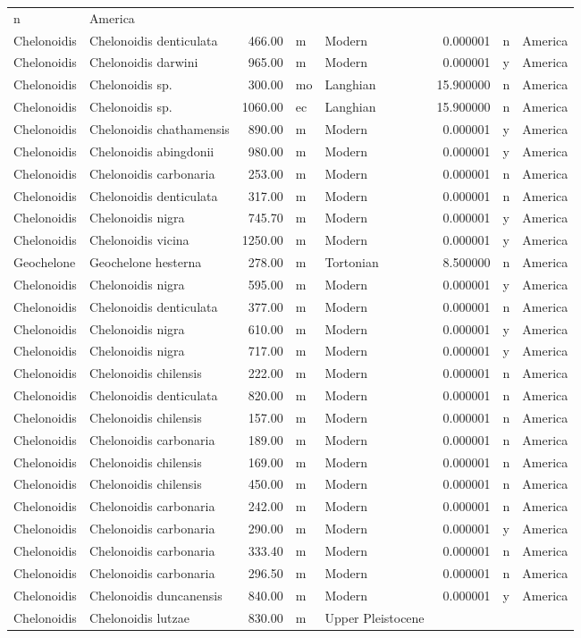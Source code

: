 \documentclass[]{article}
\begin{document}
\begin{longtable}[]{@{}llrllrll@{}}
n & America\tabularnewline
Chelonoidis & Chelonoidis denticulata & 466.00 & m & Modern & 0.000001 &
n & America\tabularnewline
Chelonoidis & Chelonoidis darwini & 965.00 & m & Modern & 0.000001 & y &
America\tabularnewline
Chelonoidis & Chelonoidis sp. & 300.00 & mo & Langhian & 15.900000 & n &
America\tabularnewline
Chelonoidis & Chelonoidis sp. & 1060.00 & ec & Langhian & 15.900000 & n
& America\tabularnewline
Chelonoidis & Chelonoidis chathamensis & 890.00 & m & Modern & 0.000001
& y & America\tabularnewline
Chelonoidis & Chelonoidis abingdonii & 980.00 & m & Modern & 0.000001 &
y & America\tabularnewline
Chelonoidis & Chelonoidis carbonaria & 253.00 & m & Modern & 0.000001 &
n & America\tabularnewline
Chelonoidis & Chelonoidis denticulata & 317.00 & m & Modern & 0.000001 &
n & America\tabularnewline
Chelonoidis & Chelonoidis nigra & 745.70 & m & Modern & 0.000001 & y &
America\tabularnewline
Chelonoidis & Chelonoidis vicina & 1250.00 & m & Modern & 0.000001 & y &
America\tabularnewline
Geochelone & Geochelone hesterna & 278.00 & m & Tortonian & 8.500000 & n
& America\tabularnewline
Chelonoidis & Chelonoidis nigra & 595.00 & m & Modern & 0.000001 & y &
America\tabularnewline
Chelonoidis & Chelonoidis denticulata & 377.00 & m & Modern & 0.000001 &
n & America\tabularnewline
Chelonoidis & Chelonoidis nigra & 610.00 & m & Modern & 0.000001 & y &
America\tabularnewline
Chelonoidis & Chelonoidis nigra & 717.00 & m & Modern & 0.000001 & y &
America\tabularnewline
Chelonoidis & Chelonoidis chilensis & 222.00 & m & Modern & 0.000001 & n
& America\tabularnewline
Chelonoidis & Chelonoidis denticulata & 820.00 & m & Modern & 0.000001 &
n & America\tabularnewline
Chelonoidis & Chelonoidis chilensis & 157.00 & m & Modern & 0.000001 & n
& America\tabularnewline
Chelonoidis & Chelonoidis carbonaria & 189.00 & m & Modern & 0.000001 &
n & America\tabularnewline
Chelonoidis & Chelonoidis chilensis & 169.00 & m & Modern & 0.000001 & n
& America\tabularnewline
Chelonoidis & Chelonoidis chilensis & 450.00 & m & Modern & 0.000001 & n
& America\tabularnewline
Chelonoidis & Chelonoidis carbonaria & 242.00 & m & Modern & 0.000001 &
n & America\tabularnewline
Chelonoidis & Chelonoidis carbonaria & 290.00 & m & Modern & 0.000001 &
y & America\tabularnewline
Chelonoidis & Chelonoidis carbonaria & 333.40 & m & Modern & 0.000001 &
n & America\tabularnewline
Chelonoidis & Chelonoidis carbonaria & 296.50 & m & Modern & 0.000001 &
n & America\tabularnewline
Chelonoidis & Chelonoidis duncanensis & 840.00 & m & Modern & 0.000001 &
y & America\tabularnewline
Chelonoidis & Chelonoidis lutzae & 830.00 & m & Upper Pleistocene &

\end{longtable}
\end{document}
